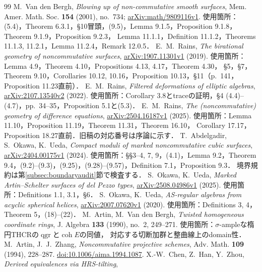 \documentclass[11pt,a4paper]{ltjsarticle}
\theoremstyle{definition}
\DeclareMathOperator{\coh}{coh}\DeclareMathOperator{\qgr}{qgr}
\begin{document}
\begin{thebibliography}{99}
M.~Van den Bergh, \emph{Blowing up of non-commutative smooth surfaces},
Mem. Amer. Math. Soc. \textbf{154} (2001), no.~734;
\href{https://arxiv.org/abs/math/9809116}{arXiv:math/9809116v1}.
使用箇所：(5.4)，Theorem 6.3.1，\S10冒頭，(9.5)，Lemma 9.1.5，Proposition 9.1.8，Theorem 9.1.9，Proposition 9.2.3，
Lemma 11.1.1，Definition 11.1.2，Theorems 11.1.3, 11.2.1，Lemma 11.2.4，Remark 12.0.5．
E.~M.~Rains, \emph{The birational geometry of noncommutative surfaces},
\href{https://arxiv.org/abs/1907.11301}{arXiv:1907.11301v1} (2019).
使用箇所：Lemma 4.9，Theorem 4.10，Propositions 4.13, 4.17，Theorem 4.30，
\S5，\S7，Theorem 9.10，Corollaries 10.12, 10.16，Proposition 10.13，\S11（p.~141，Proposition 11.23直前）．
E.~M.~Rains, \emph{Filtered deformations of elliptic algebras},
\href{https://arxiv.org/abs/2107.13540}{arXiv:2107.13540v2} (2022).
使用箇所：Corollary 3.8とtraceの証明，\S4 (4.4)--(4.7)，pp.~34--35，Proposition 5.1と(5.3)．
E.~M.~Rains, \emph{The (noncommutative) geometry of difference equations},
\href{https://arxiv.org/abs/2504.16187}{arXiv:2504.16187v1} (2025).
使用箇所：Lemma 11.10，Proposition 11.19，Theorem 11.31，Theorem 16.10，
Corollary 17.17，Proposition 18.27直前．旧稿の対応番号は序論に示す．
T.~Abdelgadir, S.~Okawa, K.~Ueda, \emph{Compact moduli of marked noncommutative cubic surfaces},
\href{https://arxiv.org/abs/2404.00175}{arXiv:2404.00175v1} (2024).
使用箇所：\S\S3--4, 7, 9，(4.1)，Lemma 9.2，Theorem 9.4，(9.2)--(9.3)，(9.25)，(9.28)--(9.57)，Definition 7.1，Proposition 9.3．
境界規約は第\ref{subsec:boundaryaudit}節で検査する．
S.~Okawa, K.~Ueda, \emph{Marked Artin--Schelter surfaces of del Pezzo types},
\href{https://arxiv.org/abs/2508.04986}{arXiv:2508.04986v1} (2025).
使用箇所：Definitions 1.1, 3.1，\S6．
S.~Okawa, K.~Ueda, \emph{AS-regular algebras from acyclic spherical helices},
\href{https://arxiv.org/abs/2007.07620v1}{arXiv:2007.07620v1} (2020).
使用箇所：Definitions 3, 4，Theorem 5，(18)--(22)．
M.~Artin, M.~Van den Bergh, \emph{Twisted homogeneous coordinate rings},
J. Algebra \textbf{133} (1990), no.~2, 249--271.
使用箇所：$\sigma$-ampleな楕円THCRの$\qgr$と$\coh E$の同値，
対応する切断加群と整曲線上のdomain性．
M.~Artin, J.~J.~Zhang, \emph{Noncommutative projective schemes},
Adv. Math. \textbf{109} (1994), 228--287.
\href{https://doi.org/10.1006/aima.1994.1087}{doi:10.1006/aima.1994.1087}.
X.-W.~Chen, Z.~Han, Y.~Zhou, \emph{Derived equivalences via HRS-tilting},

\end{thebibliography}
\end{document}
